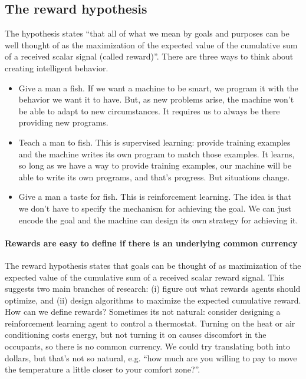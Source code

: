 \documentclass[12pt]{article}
\begin{document}
\subsection{The reward hypothesis}
The hypothesis states ``that all of what we mean by goals and purposes can be well thought of as the maximization of the expected value of the cumulative sum of a received scalar signal (called reward)''.
There are three ways to think about creating intelligent behavior.
\begin{itemize}
\item Give a man a fish. If we want a machine to be smart, we program it with the behavior we want it to have. But, as new problems arise, the machine won't be able to adapt to new circumstances. It requires us to always be there providing new programs.
\item Teach a man to fish. This is supervised learning: provide training examples and the machine writes its own program to match those examples. It learns, so long as we have a way to provide training examples, our machine will be able to write its own programs, and that's progress. But situations change.
\item Give a man a taste for fish. This is reinforcement learning. The idea is that we don't have to specify the mechanism for achieving the goal. We can just encode the goal and the machine can design its own strategy for achieving it.
\end{itemize}
\paragraph{Rewards are easy to define if there is an underlying common currency}
The reward hypothesis states that goals can be thought of as maximization of the expected value of the cumulative sum of a received scalar reward signal. This suggests two main branches of research: (i) figure out what rewards agents should optimize, and (ii) design algorithms to maximize the expected cumulative reward. How can we define rewards? Sometimes its not natural: consider designing a reinforcement learning agent to control a thermostat. Turning on the heat or air conditioning costs energy, but not turning it on causes discomfort in the occupants, so there is no common currency. We could try translating both into dollars, but that's not so natural, e.g. ``how much are you willing to pay to move the temperature a little closer to your comfort zone?''.
\end{document}

